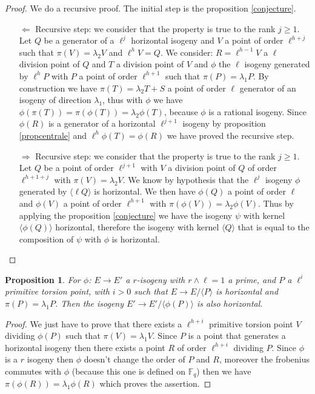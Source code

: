 \documentclass{lms}
\newtheorem{prop}[thm]{Proposition}
\begin{document}
\begin{proof}
We do a recursive proof. The initial step is the proposition \ref{conjecture}.
\begin{itemize}
\item[$\Leftarrow$]
Recursive step: we consider that the property is true to the rank $j \geqslant 1$.
Let $Q$ be a generator of a $\ell^j$ horizontal isogeny and $V$ a point of order $\ell^{h+j}$ such that $\pi(V)=\lambda_2V$ and $\ell^{h}V=Q$. We consider: $R=\ell^{h-1}V$ a $\ell$ division point of $Q$ and $T$ a division point of $V$ and $\phi$ the $\ell$ isogeny generated by $\ell^{h}P$ with $P$ a point of order $\ell^{h+1}$ such that $\pi(P)=\lambda_1P$. By construction we have $\pi(T)=\lambda_2T + S$ a point of order $\ell$ generator of an isogeny of direction $\lambda_1$, thus with $\phi$ we have $\phi(\pi(T))=\pi(\phi(T))=\lambda_2\phi(T)$, because $\phi$ is a rational isogeny. Since $\phi(R)$ is a generator of a horizontal $\ell^{j+1}$ isogeny by proposition \ref{propcentrale} and  $\ell^h\phi(T)=\phi(R)$  we have proved the recursive step. 
\item[$\Rightarrow$]
Recursive step: we consider that the property is true to the rank $j \geqslant 1$.
Let $Q$ be a point of order $\ell^{j+1}$ with $V$ a division point of $Q$ of order $\ell^{h+1+j}$ with $\pi(V)=\lambda_2V$. We know by hypothesis that the $\ell^j$ isogeny $\phi$ generated by $\langle \ell Q \rangle$ is horizontal. We then have $\phi(Q)$ a point of order $\ell$ and $\phi(V)$ a point of order $\ell^{h+1}$ with $\pi(\phi(V))=\lambda_2\phi(V)$. Thus by applying the proposition \ref{conjecture} we have the isogeny $\psi$ with kernel $\langle \phi(Q) \rangle$ horizontal, therefore the isogeny with kernel $\langle Q \rangle$ that is equal to the composition of $\psi$ with $\phi$ is horizontal.
\end{itemize}
\end{proof}

\begin{prop}
For $\phi$: $E \rightarrow E'$ a $r$-isogeny  with $r \wedge \ell=1$ a prime, and $P$ a $\ell^i$ primitive torsion point, with $i>0$ such that $E \rightarrow E / \langle P \rangle $ is horizontal and $\pi(P)=\lambda_1P$. Then the isogeny  $E' \rightarrow E' / \langle \phi(P) \rangle$ is also horizontal.
\end{prop}

\begin{proof}
We just have to prove that there exists a $\ell^{h+i}$ primitive torsion point $V$ dividing $\phi(P)$ such that $\pi(V)=\lambda_1V$.
Since $P$ is a point that generates a horizontal isogeny then there exists a point $R$ of order $\ell^{h+i}$ dividing $P$. Since $\phi$ is a $r$ isogeny then $\phi$ doesn't change the order of $P$ and $R$, moreover the frobenius commutes with $\phi$ (because this one is defined on $\mathbb{F}_q$) then we have $\pi(\phi(R))=\lambda_1\phi(R)$ which proves the assertion.
\end{proof}
\end{document}
